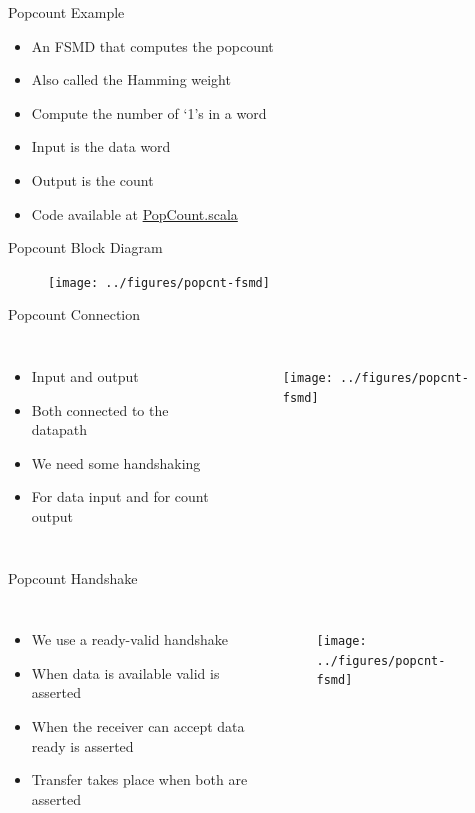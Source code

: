 \begin{frame}[fragile]{Popcount Example}
\begin{itemize}
\item An FSMD that computes the popcount
\item Also called the Hamming weight
\item Compute the number of `1's in a word
\item Input is the data word
\item Output is the count
\item Code available at \href{https://github.com/schoeberl/chisel-book/blob/master/src/main/scala/PopCount.scala}{PopCount.scala}
\end{itemize}
\end{frame}

\begin{frame}[fragile]{Popcount Block Diagram}

\begin{figure}
  \texttt{[image: ../figures/popcnt-fsmd]}
\end{figure}
\end{frame}


\begin{frame}[fragile]{Popcount Connection}
\begin{columns}
\begin{itemize}
\item Input  and output 
\item Both connected to the datapath
\item We need some handshaking
\item For data input and for count output
\end{itemize}
\begin{figure}
  \texttt{[image: ../figures/popcnt-fsmd]}
\end{figure}
\end{columns}
\end{frame}

\begin{frame}[fragile]{Popcount Handshake}
\begin{columns}
\begin{itemize}
\item We use a ready-valid handshake
\item When data is available valid is asserted
\item When the receiver can accept data ready is asserted
\item Transfer takes place when both are asserted
\end{itemize}
\begin{figure}
  \texttt{[image: ../figures/popcnt-fsmd]}
\end{figure}
\end{columns}
\end{frame}


